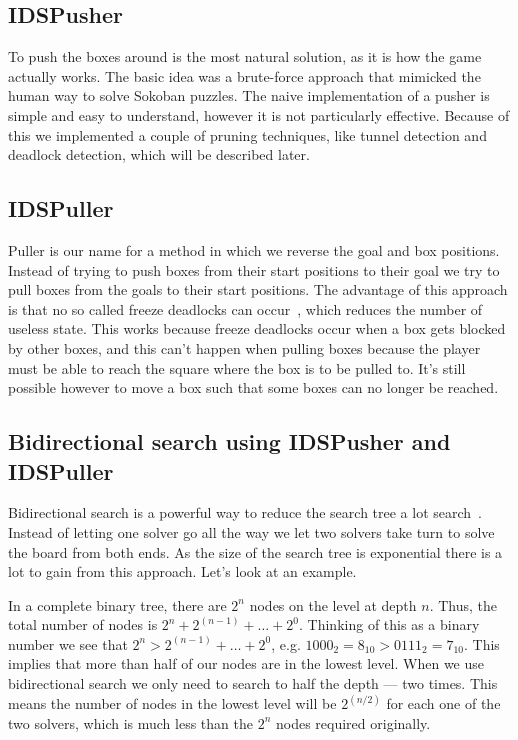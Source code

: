 \documentclass[a4paper,11pt]{article}
\renewcommand{\*}[0]{\cdot}
\begin{document}
\subsection{IDSPusher}

To push the boxes around is the most natural solution, as it is how the game
actually works. The basic idea was a brute-force approach that mimicked the
human way to solve Sokoban puzzles. The naive implementation of a pusher is
simple and easy to understand, however it is not particularly effective.
Because of this we implemented a couple of pruning techniques, like tunnel
detection and deadlock detection, which will be described later.

\subsection{IDSPuller}

Puller is our name for a method in which we reverse the goal and box positions.
Instead of trying to push boxes from their start positions to their goal we try
to pull boxes from the goals to their start positions. The advantage of this
approach is that no so called freeze deadlocks can occur~\cite{takes2007},
which reduces the number of useless state. This works because freeze deadlocks
occur when a box gets blocked by other boxes, and this can't happen when
pulling boxes because the player must be able to reach the square where the box
is to be pulled to.  It's still possible however to move a box such that some
boxes can no longer be reached.


\subsection{Bidirectional search using IDSPusher and IDSPuller}

Bidirectional search is a powerful way to reduce the search tree a lot
search~\cite{russell2009}. Instead of letting one solver go all the way we let
two solvers take turn to solve the board from both ends. As the size of the
search tree is exponential there is a lot to gain from this approach. Let's
look at an example.

In a complete binary tree, there are $2^n$ nodes on the level at depth $n$.
Thus, the total number of nodes is $2^n + 2^{(n-1)} + \ldots + 2^0$. Thinking
of this as a binary number we see that $2^n > 2^{(n-1)} + \ldots + 2^0$, e.g.
$1000_2 = 8_{10} > 0111_2 = 7_{10}$. This implies that more than half of our
nodes are in the lowest level. When we use bidirectional search we only need to
search to half the depth --- two times. This means the number of nodes in the
lowest level will be $2^{(n/2)}$ for each one of the two solvers, which is much
less than the $2^n$ nodes required originally.
\end{document}
